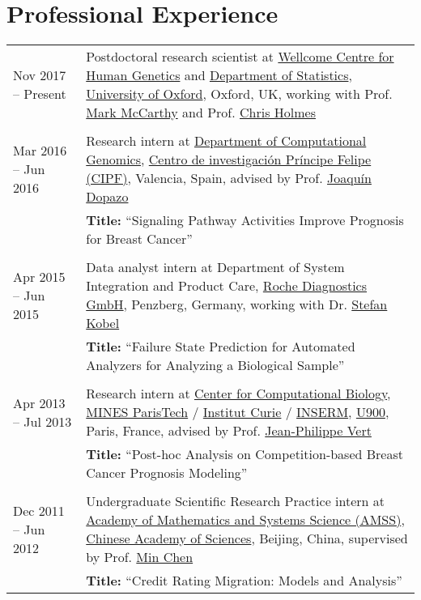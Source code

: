 \documentclass[10pt,a4paper]{article}
\begin{document}
\section*{Professional Experience}

\begin{center}
\small
\begin{tabularx}{\textwidth}{p{2.9cm}|X}

\hfill
Nov 2017 -- Present & Postdoctoral research scientist at \href{http://www.well.ox.ac.uk/}{Wellcome Centre for Human Genetics} and \href{http://www.stats.ox.ac.uk/}{Department of Statistics}, \href{http://www.ox.ac.uk/}{University of Oxford}, Oxford, UK, working with Prof. \href{https://www.ndm.ox.ac.uk/principal-investigators/researcher/mark-mccarthy}{Mark McCarthy} and Prof. \href{http://www.stats.ox.ac.uk/~cholmes/}{Chris Holmes}\\\\

\hfill
Mar 2016 -- Jun 2016 & Research intern at \href{http://bioinfo.cipf.es}{Department of Computational Genomics}, \href{http://www.cipf.es}{Centro de investigaci\'{o}n Pr\'{i}ncipe Felipe (CIPF)}, Valencia, Spain, advised by Prof. \href{http://bioinfo.cipf.es/jdopazo}{Joaqu\'{i}n Dopazo}\\
& \textbf{Title:} ``Signaling Pathway Activities Improve Prognosis for Breast Cancer''\\\\

\hfill
Apr 2015 -- Jun 2015 & Data analyst intern at Department of System Integration and Product Care, \href{http://www.roche.com}{Roche Diagnostics GmbH}, Penzberg, Germany, working with Dr. \href{https://www.linkedin.com/in/stefan-kobel-64786338}{Stefan Kobel}\\
& \textbf{Title:} ``Failure State Prediction for Automated Analyzers for Analyzing a Biological Sample''\\\\

\hfill
Apr 2013 -- Jul 2013 & Research intern at \href{http://cbio.ensmp.fr}{Center for Computational Biology}, \href{http://www.ensmp.fr}{MINES ParisTech} / \href{http://www.curie.fr/}{Institut Curie} / \href{http://www.inserm.fr}{INSERM}, \href{http://u900.curie.fr}{U900}, Paris, France, advised by Prof. \href{http://cbio.ensmp.fr/~jvert/}{Jean-Philippe Vert}\\
& \textbf{Title:} ``Post-hoc Analysis on Competition-based Breast Cancer Prognosis Modeling''\\\\

\hfill
Dec 2011 -- Jun 2012 & Undergraduate Scientific Research Practice intern at \href{http://www.amss.cas.cn}{Academy of Mathematics and Systems Science (AMSS)}, \href{http://www.cas.cn}{Chinese Academy of Sciences}, Beijing, China, supervised by Prof. \href{http://www.amt.ac.cn/member/chenmin/index.html}{Min Chen}\\
& \textbf{Title:} ``Credit Rating Migration: Models and Analysis''
\end{tabularx}
\end{center}
\end{document}
